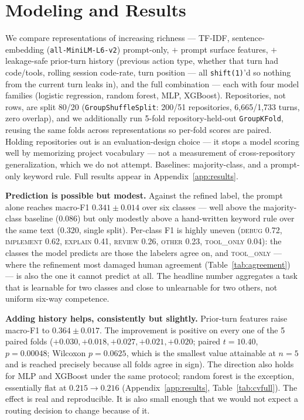 \documentclass{article}
\begin{document}
\section{Modeling and Results}
\label{sec:results}

We compare representations of increasing richness --- TF-IDF,
sentence-embedding (\texttt{all-MiniLM-L6-v2}) prompt-only, $+$ prompt surface
features, $+$ leakage-safe prior-turn history (previous action type, whether
that turn had code/tools, rolling session code-rate, turn position --- all
\texttt{shift(1)}'d so nothing from the current turn leaks in), and the full
combination --- each with four model families (logistic regression, random
forest, MLP, XGBoost). Repositories, not rows, are split 80/20
(\texttt{GroupShuffleSplit}: 200/51 repositories, 6,665/1,733 turns, zero
overlap), and we additionally run 5-fold repository-held-out
\texttt{GroupKFold}, reusing the same folds across representations so per-fold
scores are paired. Holding repositories out is an evaluation-design choice ---
it stops a model scoring well by memorizing project vocabulary --- not a
measurement of cross-repository generalization, which we do not attempt.
Baselines: majority-class, and a prompt-only keyword rule. Full results appear
in Appendix~\ref{app:results}.

\textbf{Prediction is possible but modest.} Against the refined label, the
prompt alone reaches macro-F1 $0.341 \pm 0.014$ over six classes --- well above
the majority-class baseline (0.086) but only modestly above a hand-written
keyword rule over the same text (0.320, single split). Per-class F1 is highly
uneven (\textsc{debug} 0.72, \textsc{implement} 0.62, \textsc{explain} 0.41,
\textsc{review} 0.26, \textsc{other} 0.23, \textsc{tool\_only} 0.04): the
classes the model predicts are those the labelers agree on, and
\textsc{tool\_only} --- where the refinement most damaged human agreement
(Table~\ref{tab:agreement}) --- is also the one it cannot predict at all. The
headline number aggregates a task that is learnable for two classes and close to
unlearnable for two others, not uniform six-way competence.

\textbf{Adding history helps, consistently but slightly.} Prior-turn features
raise macro-F1 to $0.364 \pm 0.017$. The improvement is positive on every one of
the 5 paired folds ($+0.030, +0.018, +0.027, +0.021, +0.020$; paired
$t = 10.40$, $p = 0.00048$; Wilcoxon $p = 0.0625$, which is the smallest value
attainable at $n{=}5$ and is reached precisely because all folds agree in sign).
The direction also holds for MLP and XGBoost under the same protocol; random
forest is the exception, essentially flat at $0.215 \to 0.216$
(Appendix~\ref{app:results}, Table~\ref{tab:cvfull}). The effect is real and
reproducible. It is also small enough that we would not expect a routing
decision to change because of it.
\end{document}
